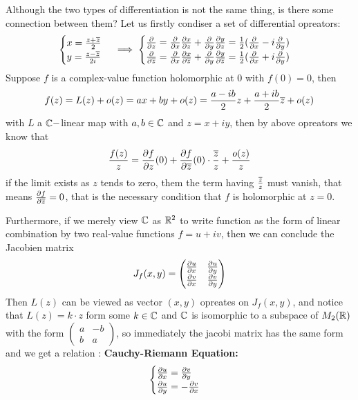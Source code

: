 \documentclass[en,geye,blue,pc,12pt]{elegantnote}
\begin{document}
Although the two types of differentiation is not the same thing, is there some connection between them? Let us firstly condiser a set of differential opreators:
\[\begin{cases}
    x = \frac{z + \overline{z}}{2} \\
    y = \frac{z - \overline{z}}{2i}
\end{cases} \implies \begin{cases}
    \frac{\partial }{\partial z} = \frac{\partial }{\partial x}\frac{\partial x}{\partial z}+\frac{\partial }{\partial y}\frac{\partial y}{\partial z} = \frac{1}{2}(\frac{\partial }{\partial x}-i \frac{\partial }{\partial y})\\
    \frac{\partial }{\partial \overline{z}} = \frac{\partial }{\partial x}\frac{\partial x}{\partial \overline{z}}+\frac{\partial }{\partial y}\frac{\partial y}{\partial \overline{z}} = \frac{1}{2}(\frac{\partial }{\partial x}+i \frac{\partial }{\partial y})
\end{cases}\]
Suppose \(f\) is a complex-value function holomorphic at \(0\) with \(f(0)= 0\), then
\[f(z) = L(z)+o(z) = ax+by+o(z) = \frac{a-ib}{2}z+\frac{a+ib}{2}\overline{z}+o(z)\]
with \(L\) a \(\mathbb{C}-\)linear map with \(a,b \in \mathbb{C}\) and \(z = x+iy\), then by above opreators we know that
\[\frac{f(z)}{z} = \frac{\partial f}{\partial z}(0)+\frac{\partial f}{\partial \overline{z}}(0)\cdot\frac{\overline{z}}{z}+\frac{o(z)}{z}\]
if the limit exists as \(z\) tends to zero, them the term having \(\frac{\overline{z}}{z}\) must vanish, that means \(\frac{\partial f}{\partial \overline{z}} = 0\), that is the necessary condition that \(f\) is holomorphic at \(z=0\).

Furthermore, if we merely view \(\mathbb{C}\) as \(\mathbb{R}^2\) to write function as the form of linear combination by two real-value functions \(f=u+iv\), then we can conclude the Jacobien matrix 
\[J_f(x,y) = \begin{pmatrix}
    \frac{\partial u}{\partial x} & \frac{\partial u}{\partial y} \\
    \frac{\partial v}{\partial x} & \frac{\partial v}{\partial y}
\end{pmatrix}\]
Then \(L(z)\) can be viewed as vector \((x,y)\) opreates on \(J_f(x,y)\), and notice that \(L(z) = k\cdot z\) form some \(k \in \mathbb{C}\) and \(\mathbb{C}\) is isomorphic to a subspace of \(M_2(\mathbb{R})\) with the form \(\begin{pmatrix}
    a &-b\\
    b &a
\end{pmatrix}\), so immediately the jacobi matrix has the same form and we get a relation : \textbf{Cauchy-Riemann Equation:}
\[\begin{cases}
    \frac{\partial u}{\partial x} = \frac{\partial v}{\partial y} \\
    \frac{\partial u}{\partial y} = - \frac{\partial v}{\partial x}
\end{cases}\]
\end{document}

